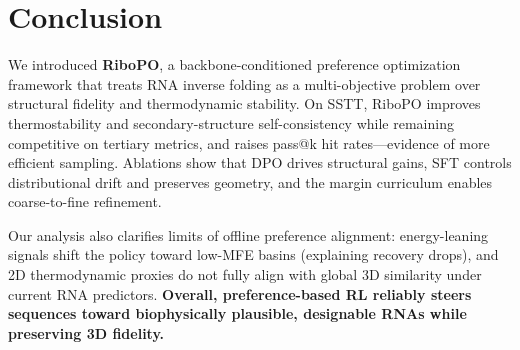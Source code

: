 \section{{Conclusion}}
We introduced \textbf{RiboPO}, a backbone-conditioned preference optimization framework that treats RNA inverse folding as a multi-objective problem over structural fidelity and thermodynamic stability. On SSTT, RiboPO improves thermostability and secondary-structure self-consistency while remaining competitive on tertiary metrics, and raises pass@k hit rates—evidence of more efficient sampling. Ablations show that DPO drives structural gains, SFT controls distributional drift and preserves geometry, and the margin curriculum enables coarse-to-fine refinement.

Our analysis also clarifies limits of offline preference alignment: energy-leaning signals shift the policy toward low-MFE basins (explaining recovery drops), and 2D thermodynamic proxies do not fully align with global 3D similarity under current RNA predictors. \textbf{Overall, preference-based RL reliably steers sequences toward biophysically plausible, designable RNAs while preserving 3D fidelity.}



